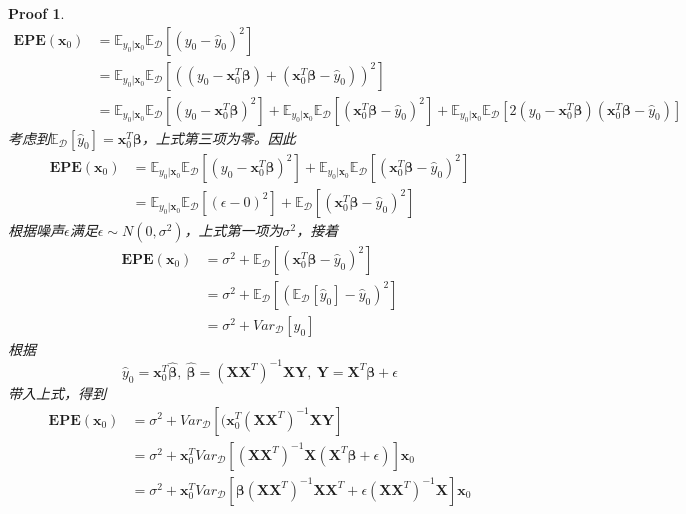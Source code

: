 \documentclass[a4paper,UTF8]{article}
\numberwithin{equation}{section}
\newtheorem*{myProof}{Proof}
\begin{document}
\begin{myProof}

\begin{align*}
\mathbf{EPE}(\textbf{x}_0) &= \mathbb{E}_{y_0|\textbf{x}_0} \mathbb{E}_{\mathcal{D}}[(y_0-\hat{y}_0)^2] \\
& = \mathbb{E}_{y_0|\textbf{x}_0} \mathbb{E}_{\mathcal{D}} [((y_0 - \textbf{x}_0^T\bm{\beta} )+( \textbf{x}_0^T\bm{\beta} - \hat{y}_0))^2] \\
& = \mathbb{E}_{y_0|\textbf{x}_0} \mathbb{E}_{\mathcal{D}} [(y_0 - \textbf{x}_0^T\bm{\beta} )^2] +  \mathbb{E}_{y_0|\textbf{x}_0} \mathbb{E}_{\mathcal{D}} [( \textbf{x}_0^T\bm{\beta} - \hat{y}_0)^2] +  \mathbb{E}_{y_0|\textbf{x}_0} \mathbb{E}_{\mathcal{D}} [2(y_0 - \textbf{x}_0^T\bm{\beta} )(\textbf{x}_0^T\bm{\beta} - \hat{y}_0)]
\end{align*}
考虑到$\mathbb{E}_{\mathcal{D}}[\hat{y}_0] = \textbf{x}_0^T\bm{\beta}$，上式第三项为零。因此
\begin{align*}
\mathbf{EPE}(\textbf{x}_0) & = \mathbb{E}_{y_0|\textbf{x}_0} \mathbb{E}_{\mathcal{D}} [(y_0 - \textbf{x}_0^T\bm{\beta} )^2] +  \mathbb{E}_{y_0|\textbf{x}_0} \mathbb{E}_{\mathcal{D}} [( \textbf{x}_0^T\bm{\beta} - \hat{y}_0)^2] \\
& = \mathbb{E}_{y_0|\textbf{x}_0} \mathbb{E}_{\mathcal{D}} [(\epsilon - 0)^2] + \mathbb{E}_{\mathcal{D}} [( \textbf{x}_0^T\bm{\beta} - \hat{y}_0)^2]
\end{align*}
根据噪声$\epsilon$满足$\epsilon\sim N(0,\sigma^2)$，上式第一项为$\sigma^2$，接着
\begin{align*}
\mathbf{EPE}(\textbf{x}_0) & = \sigma^2 + \mathbb{E}_{\mathcal{D}} [( \textbf{x}_0^T\bm{\beta} - \hat{y}_0)^2] \\
& = \sigma^2 + \mathbb{E}_{\mathcal{D}} [(\mathbb{E}_{\mathcal{D}}[\hat{y}_0]-\hat{y}_0)^2] \\
& = \sigma^2 + Var_{\mathcal{D}}[\hat{y}_0]
\end{align*}
根据
\[ \hat{y}_0 = \textbf{x}_0^T \hat{\bm{\beta}},~\hat{\bm{\beta}}=(\textbf{X}\textbf{X}^T)^{-1}\textbf{X}\textbf{Y},~\textbf{Y}=\textbf{X}^T\bm{\beta}+\epsilon \]
带入上式，得到
\begin{align*}
\mathbf{EPE}(\textbf{x}_0) & = \sigma^2 + Var_{\mathcal{D}}[(\textbf{x}_0^T(\textbf{X}\textbf{X}^T)^{-1}\textbf{X}\textbf{Y}] \\
& =  \sigma^2 + \textbf{x}_0^T Var_{\mathcal{D}}[(\textbf{X}\textbf{X}^T)^{-1}\textbf{X}(\textbf{X}^T\bm{\beta}+\epsilon)] \textbf{x}_0\\
& =  \sigma^2 + \textbf{x}_0^T Var_{\mathcal{D}}[\bm{\beta}(\textbf{X}\textbf{X}^T)^{-1}\textbf{X}\textbf{X}^T+\epsilon(\textbf{X}\textbf{X}^T)^{-1}\textbf{X}] \textbf{x}_0 \\

\end{align*}
\end{myProof}
\end{document}
